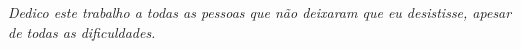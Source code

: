 \chapter*{}
\vfill{}
\begin{flushright}
    \emph{Dedico este trabalho a todas as pessoas que não deixaram que eu
    desistisse, apesar de todas as dificuldades.}
\end{flushright}
\newpage

